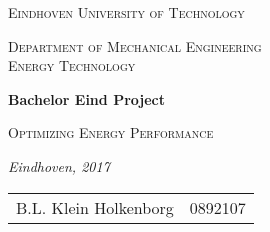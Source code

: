 
\begin{titlepage}
	\centering
	\vspace*{2cm}
	{\scshape\Large Eindhoven University of Technology \par}
	\vspace{.5cm}
	{\scshape\large Department of Mechanical Engineering\\ Energy Technology\par}
	\vspace{2.5cm}
	{\LARGE\bfseries Bachelor Eind Project \par}
    \vspace{0.3cm}
    {\scshape \large Optimizing Energy Performance}\\
	\vspace{.25cm}
	{\large\itshape Eindhoven, 2017 \par}
	\vfill
	
\begin{flushleft}
	\begin{tabular}{ll}
	\\		B.L. Klein Holkenborg & 0892107
 	\end{tabular}
    \vspace{1.5cm}
\end{flushleft} 
		
\end{titlepage}